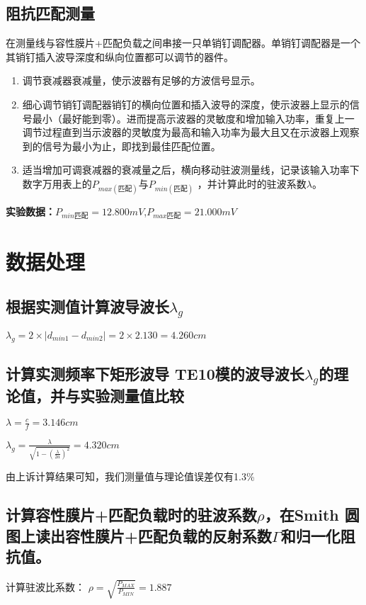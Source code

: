 \documentclass{../source/zjureport}
\begin{document}
        \subsection{阻抗匹配测量}
        在测量线与容性膜片+匹配负载之间串接一只单销钉调配器。单销钉调配器是一个其销钉插入波导深度和纵向位置都可以调节的器件。
        \begin{enumerate}
            \item 调节衰减器衰减量，使示波器有足够的方波信号显示。
            \item 细心调节销钉调配器销钉的横向位置和插入波导的深度，使示波器上显示的信号最小（最好能到零）。进而提高示波器的灵敏度和增加输入功率，重复上一调节过程直到当示波器的灵敏度为最高和输入功率为最大且又在示波器上观察到的信号为最小为止，即找到最佳匹配位置。
            \item 
            适当增加可调衰减器的衰减量之后，横向移动驻波测量线，记录该输入功率下数字万用表上的$P_{max(\text{匹配})}$与$P_{min(\text{匹配})} $ ，并计算此时的驻波系数$\lambda$。
        \end{enumerate}
        {\bf 实验数据：}$P_{min\text{匹配}} = 12.800mV$,$P_{max\text{匹配}} = 21.000mV$

    \section{数据处理}
        \subsection{根据实测值计算波导波长$\lambda_g$}
        $\lambda_g = 2\times |d_{min1} - d_{min2}| = 2\times 2.130 = 4.260cm$
        \subsection{计算实测频率下矩形波导 TE10模的波导波长$\lambda_g$的理论值，并与实验测量值比较}
        $\lambda = \frac{c}{f} = 3.146cm$

        $\lambda_{g}=\frac{\lambda}{\sqrt{1-\left(\frac{\lambda}{2 a}\right)^{2}}} = 4.320cm$

        由上诉计算结果可知，我们测量值与理论值误差仅有1.3\%

        \subsection{计算容性膜片+匹配负载时的驻波系数$\rho$，在Smith 圆图上读出容性膜片+匹配负载的反射系数$\Gamma$和归一化阻抗值。}
        计算驻波比系数：
        $\rho = \sqrt{\frac{P_{MAX}}{P_{MIN}}} = 1.887$
\end{document}
